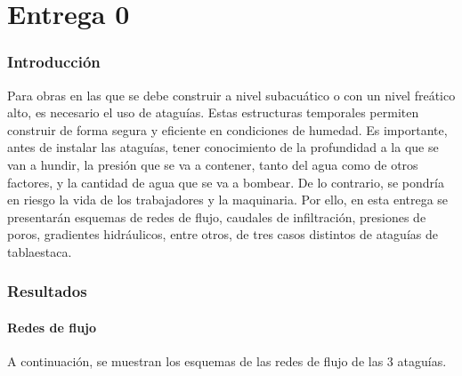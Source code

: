 \documentclass{article}
\begin{document}
\part{Entrega 0}
\section{Introducción}
Para obras en las que se debe construir a nivel subacuático o con un nivel freático alto, es necesario el uso de ataguías. Estas estructuras temporales permiten construir de forma segura y eficiente en condiciones de humedad. Es importante, antes de instalar las ataguías, tener conocimiento de la profundidad a la que se van a hundir, la presión que se va a contener, tanto del agua como de otros factores, y la cantidad de agua que se va a bombear. De lo contrario, se pondría en riesgo la vida de los trabajadores y la maquinaria. Por ello, en esta entrega se presentarán esquemas de redes de flujo, caudales de infiltración, presiones de poros, gradientes hidráulicos, entre otros, de tres casos distintos de ataguías de tablaestaca.

\newpage

\section{Resultados}
\subsection{Redes de flujo}
A continuación, se muestran los esquemas de las redes de flujo de las 3 ataguías. 
\end{document}

